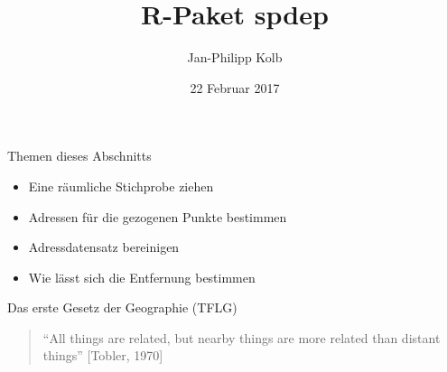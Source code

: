 \documentclass[ignorenonframetext,]{beamer}
\title{R-Paket spdep}
\author{Jan-Philipp Kolb}
\date{22 Februar 2017}
\providecommand{\tightlist}{%
  \setlength{\itemsep}{0pt}\setlength{\parskip}{0pt}}
\begin{document}
\frame{\titlepage}

\begin{frame}{Themen dieses Abschnitts}

\begin{itemize}
\tightlist
\item
  Eine räumliche Stichprobe ziehen
\item
  Adressen für die gezogenen Punkte bestimmen
\item
  Adressdatensatz bereinigen
\item
  Wie lässt sich die Entfernung bestimmen
\end{itemize}

\begin{block}{Das erste Gesetz der Geographie (TFLG)}

\begin{quote}
``All things are related, but nearby things are more related than
distant things'' {[}Tobler, 1970{]}
\end{quote}

\end{block}

\end{frame}
\end{document}
